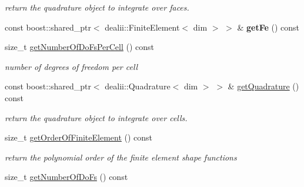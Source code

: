 \begin{DoxyCompactItemize}
\begin{DoxyCompactList}\small\item\em return the quadrature object to integrate over faces. \item\end{DoxyCompactList}\item 
\hypertarget{classnatrium_1_1AdvectionOperator_a4d6b06b8adf7deaae029e076b197560a}{
const boost::shared\_\-ptr$<$ dealii::FiniteElement$<$ dim $>$ $>$ \& {\bfseries getFe} () const }
\label{classnatrium_1_1AdvectionOperator_a4d6b06b8adf7deaae029e076b197560a}

\item 
size\_\-t \hyperlink{classnatrium_1_1AdvectionOperator_abd4d7735336cda33f9c117ffcee0db0b}{getNumberOfDoFsPerCell} () const 
\begin{DoxyCompactList}\small\item\em number of degrees of freedom per cell \item\end{DoxyCompactList}\item 
\hypertarget{classnatrium_1_1AdvectionOperator_a38a1bb6cc12ee88da3f0580b95f399c5}{
const boost::shared\_\-ptr$<$ dealii::Quadrature$<$ dim $>$ $>$ \& \hyperlink{classnatrium_1_1AdvectionOperator_a38a1bb6cc12ee88da3f0580b95f399c5}{getQuadrature} () const }
\label{classnatrium_1_1AdvectionOperator_a38a1bb6cc12ee88da3f0580b95f399c5}

\begin{DoxyCompactList}\small\item\em return the quadrature object to integrate over cells. \item\end{DoxyCompactList}\item 
\hypertarget{classnatrium_1_1AdvectionOperator_a186174a39dc395973b8f3fd368632333}{
size\_\-t \hyperlink{classnatrium_1_1AdvectionOperator_a186174a39dc395973b8f3fd368632333}{getOrderOfFiniteElement} () const }
\label{classnatrium_1_1AdvectionOperator_a186174a39dc395973b8f3fd368632333}

\begin{DoxyCompactList}\small\item\em return the polynomial order of the finite element shape functions \item\end{DoxyCompactList}\item 
\hypertarget{classnatrium_1_1AdvectionOperator_a49514ed3873072b50f381ed39c2be2d1}{
size\_\-t \hyperlink{classnatrium_1_1AdvectionOperator_a49514ed3873072b50f381ed39c2be2d1}{getNumberOfDoFs} () const }
\label{classnatrium_1_1AdvectionOperator_a49514ed3873072b50f381ed39c2be2d1}


\end{DoxyCompactItemize}
